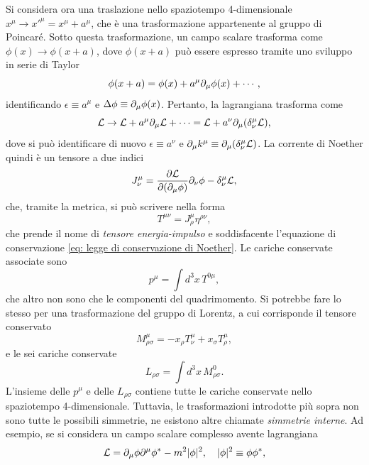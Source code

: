 Si considera ora una traslazione nello spaziotempo 4-dimensionale $x^\mu \to x'^\mu = x^\mu + a^\mu$, che è una trasformazione appartenente al gruppo di Poincaré. Sotto questa trasformazione, un campo scalare trasforma come $\phi(x) \to \phi(x + a)$, dove $\phi(x + a)$ può essere espresso tramite uno sviluppo in serie di Taylor
\begin{equation}
    \phi(x + a) = \phi(x) + a^\mu\partial_\mu\phi(x) + \cdots,
\end{equation}
identificando $\epsilon \equiv a^\mu$ e $\Delta\phi \equiv \partial_\mu\phi(x)$. Pertanto, la lagrangiana trasforma come
\begin{equation}
    \mathcal{L} \to \mathcal{L} + a^\mu\partial_\mu\mathcal{L} + \cdots = \mathcal{L} + a^\nu\partial_\mu(\delta^\mu_\nu\mathcal{L}),
\end{equation}
dove si può identificare di nuovo $\epsilon \equiv a^\nu$ e $\partial_\mu k^\mu \equiv \partial_\mu(\delta^\mu_\nu\mathcal{L})$. La corrente di Noether quindi è un tensore a due indici
\begin{equation}
    J^\mu_\nu = \frac{\partial\mathcal{L}}{\partial(\partial_\mu\phi)}\partial_\nu\phi - \delta^\mu_\nu\mathcal{L},
\end{equation}
che, tramite la metrica, si può scrivere nella forma
\begin{equation}
    T^{\mu\nu} = J^\mu_\rho \eta^{\rho\nu},
\end{equation}
che prende il nome di \emph{tensore energia-impulso} e soddisfacente l'equazione di conservazione \eqref{eq: legge di conservazione di Noether}. Le cariche conservate associate sono
\begin{equation}
    p^\mu = \int d^3x\,T^{0\mu},
\end{equation}
che altro non sono che le componenti del quadrimomento. Si potrebbe fare lo stesso per una trasformazione del gruppo di Lorentz, a cui corrisponde il tensore conservato
\begin{equation}
    M^\mu_{\rho\sigma} = -x_\rho T^\mu_\nu + x_\sigma T^\mu_\rho,
\end{equation}
e le sei cariche conservate
\begin{equation}
    L_{\rho\sigma} = \int d^3x\, M^0_{\rho\sigma}.
\end{equation}
L'insieme delle $p^\mu$ e delle $L_{\rho\sigma}$ contiene tutte le cariche conservate nello spaziotempo 4-dimensionale. Tuttavia, le trasformazioni introdotte più sopra non sono tutte le possibili simmetrie, ne esistono altre chiamate \emph{simmetrie interne}. Ad esempio, se si considera un campo scalare complesso avente lagrangiana
\begin{equation}
    \mathcal{L} = \partial_\mu\phi\partial^\mu\phi^* - m^2|\phi|^2,\quad |\phi|^2 \equiv \phi\phi^*,
\end{equation}
